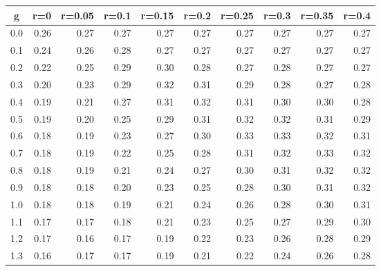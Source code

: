 %
\begin{table}[!tbp]
 \begin{center}
 \begin{tabular}{rrrrrrrrrr}\hline\hline
\multicolumn{1}{c}{g}&\multicolumn{1}{c}{r=0}&\multicolumn{1}{c}{r=0.05}&\multicolumn{1}{c}{r=0.1}&\multicolumn{1}{c}{r=0.15}&\multicolumn{1}{c}{r=0.2}&\multicolumn{1}{c}{r=0.25}&\multicolumn{1}{c}{r=0.3}&\multicolumn{1}{c}{r=0.35}&\multicolumn{1}{c}{r=0.4}\tabularnewline
\hline
0.0&0.26&0.27&0.27&0.27&0.27&0.27&0.27&0.27&0.27\tabularnewline
0.1&0.24&0.26&0.28&0.27&0.27&0.27&0.27&0.27&0.27\tabularnewline
0.2&0.22&0.25&0.29&0.30&0.28&0.27&0.28&0.27&0.27\tabularnewline
0.3&0.20&0.23&0.29&0.32&0.31&0.29&0.28&0.27&0.28\tabularnewline
0.4&0.19&0.21&0.27&0.31&0.32&0.31&0.30&0.30&0.28\tabularnewline
0.5&0.19&0.20&0.25&0.29&0.31&0.32&0.32&0.31&0.29\tabularnewline
0.6&0.18&0.19&0.23&0.27&0.30&0.33&0.33&0.32&0.31\tabularnewline
0.7&0.18&0.19&0.22&0.25&0.28&0.31&0.32&0.33&0.32\tabularnewline
0.8&0.18&0.19&0.21&0.24&0.27&0.30&0.31&0.32&0.32\tabularnewline
0.9&0.18&0.18&0.20&0.23&0.25&0.28&0.30&0.31&0.32\tabularnewline
1.0&0.18&0.18&0.19&0.21&0.24&0.26&0.28&0.30&0.31\tabularnewline
1.1&0.17&0.17&0.18&0.21&0.23&0.25&0.27&0.29&0.30\tabularnewline
1.2&0.17&0.16&0.17&0.19&0.22&0.23&0.26&0.28&0.29\tabularnewline
1.3&0.16&0.17&0.17&0.19&0.21&0.22&0.24&0.26&0.28\tabularnewline
\hline
\end{tabular}

\end{center}

\end{table}

